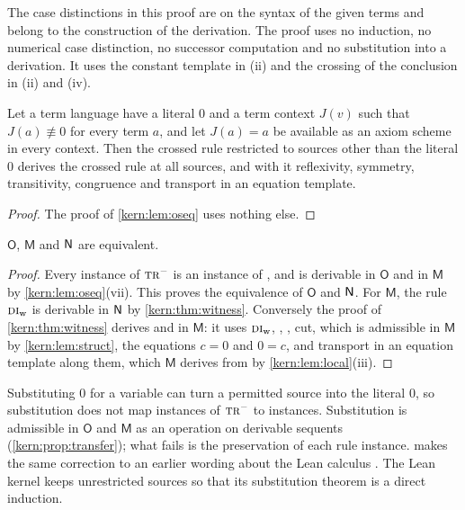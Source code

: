 The case distinctions in this proof are on the syntax of the given terms and
belong to the construction of the derivation.  The proof uses no induction,
no numerical case distinction, no successor computation and no substitution
into a derivation.  It uses the constant template in (ii) and the crossing
of the conclusion in (ii) and (iv).

\begin{proposition}
\label{kern:prop:retraction}
Let a term language have a literal $0$ and a term context $J(v)$ such that
$J(a)\not\equiv 0$ for every term $a$, and let $J(a)=a$ be available as an
axiom scheme in every context.  Then the crossed rule restricted to sources
other than the literal $0$ derives the crossed rule at all sources, and with
it reflexivity, symmetry, transitivity, congruence and transport in an
equation template.
\end{proposition}

\begin{proof}
The proof of \cref{kern:lem:oseq} uses nothing else.
\end{proof}

\begin{theorem}
\label{kern:thm:onesided}
$\mathsf{O}$, $\mathsf{M}$ and $\mathsf{N}$ are equivalent.
\end{theorem}

\begin{proof}
Every instance of $\rulename{Tr}^{-}$ is an instance of , and
 is derivable in $\mathsf{O}$ and in $\mathsf{M}$ by
\cref{kern:lem:oseq}(vii).  This proves the equivalence of $\mathsf{O}$ and
$\mathsf{N}$.  For $\mathsf{M}$, the rule $\rulename{DI}_{\mathrm{w}}$ is derivable
in $\mathsf{N}$ by \cref{kern:thm:witness}.  Conversely the proof of
\cref{kern:thm:witness} derives  and  in
$\mathsf{M}$: it uses $\rulename{DI}_{\mathrm{w}}$, ,
, cut, which is admissible in $\mathsf{M}$ by
\cref{kern:lem:struct}, the equations $c=0$ and $0=c$, and transport in an
equation template along them, which $\mathsf{M}$ derives from 
by \cref{kern:lem:local}(iii).
\end{proof}

\begin{remark}
\label{kern:rem:ossubst}
Substituting $0$ for a variable can turn a permitted source into the literal
$0$, so substitution does not map instances of $\rulename{Tr}^{-}$ to
instances.  Substitution is admissible in $\mathsf{O}$ and $\mathsf{M}$ as an
operation on derivable sequents (\cref{kern:prop:transfer}); what fails is
the preservation of each rule instance.   makes the same
correction to an earlier wording about the Lean calculus .  The
Lean kernel keeps unrestricted sources so that its substitution theorem is a
direct induction.
\end{remark}

